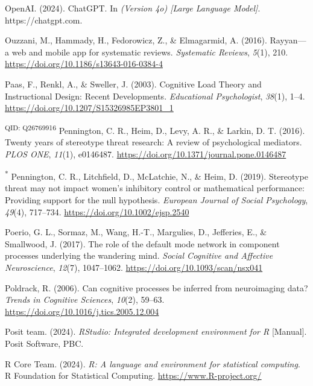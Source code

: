 \documentclass[
  stu, a4paper,floatsintext]{apa7}
\newlength{\cslhangindent}
\newenvironment{CSLReferences}[2] %
 {\begin{list}{}{%
  \setlength{\itemindent}{0pt}
  \setlength{\leftmargin}{0pt}
  \setlength{\parsep}{0pt}
  \ifodd #1
   \setlength{\leftmargin}{\cslhangindent}
   \setlength{\itemindent}{-1\cslhangindent}
  \fi
  \setlength{\itemsep}{#2\baselineskip}}}
 {\end{list}}
\begin{document}
\begin{CSLReferences}{1}{0}
OpenAI. (2024). {ChatGPT}. In \emph{(Version 4o) {[}Large Language Model{]}}. https://chatgpt.com.

Ouzzani, M., Hammady, H., Fedorowicz, Z., \& Elmagarmid, A. (2016). Rayyan---a web and mobile app for systematic reviews. \emph{Systematic Reviews}, \emph{5}(1), 210. \url{https://doi.org/10.1186/s13643-016-0384-4}

Paas, F., Renkl, A., \& Sweller, J. (2003). Cognitive {Load Theory} and {Instructional Design}: {Recent Developments}. \emph{Educational Psychologist}, \emph{38}(1), 1--4. \url{https://doi.org/10.1207/S15326985EP3801_1}

\textsuperscript{QID: Q26769916} Pennington, C. R., Heim, D., Levy, A. R., \& Larkin, D. T. (2016). Twenty years of stereotype threat research: A review of psychological mediators. \emph{PLOS ONE}, \emph{11}(1), e0146487. \url{https://doi.org/10.1371/journal.pone.0146487}

\textsuperscript{*} Pennington, C. R., Litchfield, D., McLatchie, N., \& Heim, D. (2019). Stereotype threat may not impact women's inhibitory control or mathematical performance: {Providing} support for the null hypothesis. \emph{European Journal of Social Psychology}, \emph{49}(4), 717--734. \url{https://doi.org/10.1002/ejsp.2540}

Poerio, G. L., Sormaz, M., Wang, H.-T., Margulies, D., Jefferies, E., \& Smallwood, J. (2017). The role of the default mode network in component processes underlying the wandering mind. \emph{Social Cognitive and Affective Neuroscience}, \emph{12}(7), 1047--1062. \url{https://doi.org/10.1093/scan/nsx041}

Poldrack, R. (2006). Can cognitive processes be inferred from neuroimaging data? \emph{Trends in Cognitive Sciences}, \emph{10}(2), 59--63. \url{https://doi.org/10.1016/j.tics.2005.12.004}

Posit team. (2024). \emph{{RStudio}: {Integrated} development environment for {R}} {[}Manual{]}. Posit Software, PBC.

R Core Team. (2024). \emph{R: A language and environment for statistical computing}. R Foundation for Statistical Computing. \url{https://www.R-project.org/}


\end{CSLReferences}
\end{document}
